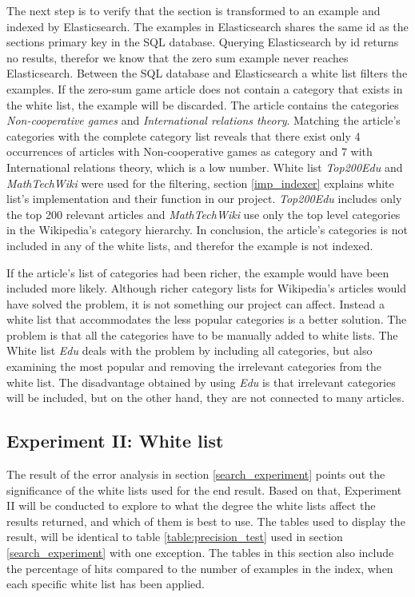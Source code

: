 The next step is to verify that the section is transformed to an example and indexed by Elasticsearch. The examples in Elasticsearch shares the same id as the sections primary key in the SQL database. Querying Elasticsearch by id returns no results, therefor we know that the zero sum example never reaches Elasticsearch. Between the SQL database and Elasticsearch a white list filters the examples. If the zero-sum game article does not contain a category that exists in the white list, the example will be discarded. The article contains the categories \textit{Non-cooperative games} and \textit{International relations theory}. Matching the article's categories with the complete category list reveals that there exist only 4 occurrences of articles with Non-cooperative games as category and 7 with International relations theory, which is a low number. White list \textit{Top200Edu} and \textit{MathTechWiki} were used for the filtering, section \ref{imp_indexer} explains white list's implementation and their function in our project. \textit{Top200Edu} includes only the top 200 relevant articles and \textit{MathTechWiki} use only the top level categories in the Wikipedia's category hierarchy. In conclusion, the article's categories is not included in any of the white lists, and therefor the example is not indexed.

If the article's list of categories had been richer, the example would have been included more likely. Although richer category lists for Wikipedia's articles would have solved the problem, it is not something our project can affect. Instead a white list that accommodates the less popular categories is a better solution. The problem is that all the categories have to be manually added to white lists. The White list \textit{Edu} deals with the problem by including all categories, but also examining the most popular and removing the irrelevant categories from the white list. The disadvantage obtained by using \textit{Edu} is that irrelevant categories will be included, but on the other hand, they are not connected to many articles. 

\subsection{Experiment II: White list}

The result of the error analysis in section \ref{search_experiment} points out the significance of the white lists used for the end result. Based on that, Experiment II will be conducted to explore to what the degree the white lists affect the results returned, and which of them is best to use. The tables used to display the result, will be identical to table \ref{table:precision_test} used in section \ref{search_experiment} with one exception. The tables in this section also include the percentage of hits compared to the number of examples in the index, when each specific white list has been applied. 

